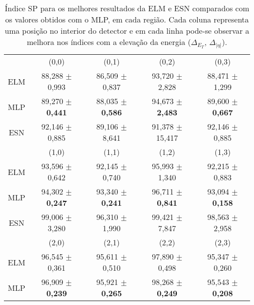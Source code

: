 \begin{table}[H]
	\centering
	\caption{Índice SP para os melhores resultados da ELM e ESN comparados com os valores obtidos com o MLP, em cada região. Cada coluna representa uma posição no interior do detector e em cada linha pode-se observar a melhora nos índices com a elevação da energia ($\Delta_{E_T}$, $\Delta_{|\eta|}$).}
	\label{tab:sp_2015}
	\begin{footnotesize}
		\setlength{\extrarowheight}{0pt}       %
		\begin{tabular}{c*{4}c} \toprule
		    	&        (0,0)       &       (0,1)        &       (0,2)         &  (0,3)         \\ \cmidrule(lr){2-2}\cmidrule(lr){3-3}\cmidrule(lr){4-4}\cmidrule(lr){5-5}
			ELM & 88,288 $\pm$ 0,993 & 86,509 $\pm$ 0,837 & 93,720 $\pm$  2,828 & 88,471 $\pm$ 1,299 \\
			MLP & 89,270 $\pm$ \textbf{0,441} & 88,035 $\pm$ \textbf{0,586} & 94,673 $\pm$  \textbf{2,483} & 89,600 $\pm$ \textbf{0,667} \\
			ESN & \cellcolor{blue!15}92,146 $\pm$ 0,885 & 89,106 $\pm$ 8,641 & 91,378 $\pm$ 15,417 & \cellcolor{blue!15}92,146 $\pm$ 0,885 \\ \midrule \midrule
                &        (1,0)       &       (1,1)        &        (1,2)        & (1,3)        \\ \cmidrule(lr){2-2}\cmidrule(lr){3-3}\cmidrule(lr){4-4}\cmidrule(lr){5-5}			
			ELM & 93,596 $\pm$ 0,642 & 92,145 $\pm$ 0,740 & 95,993 $\pm$  1,340 & 92,215 $\pm$ 0,883 \\
			MLP & 94,302 $\pm$ \textbf{0,247} & 93,340 $\pm$ \textbf{0,241} & 96,711 $\pm$  \textbf{0,841} & 93,094 $\pm$ \textbf{0,158} \\
			ESN & 99,006 $\pm$ 3,280 & 96,310 $\pm$ 1,990 & 99,421 $\pm$  7,847 & 98,563 $\pm$ 2,958 \\ \midrule \midrule
		      &          (2,0)       &        (2,1)       &        (2,2)        &       (2,3)        \\ \cmidrule(lr){2-2}\cmidrule(lr){3-3}\cmidrule(lr){4-4}\cmidrule(lr){5-5}			
			ELM & 96,545 $\pm$ 0,361 & 95,611 $\pm$ 0,510 & 97,890 $\pm$  0,498 & 95,347 $\pm$ 0,260 \\
			MLP & 96,909 $\pm$ \textbf{0,239} & 95,921 $\pm$ \textbf{0,265} & 98,268 $\pm$  \textbf{0,249} & 95,543 $\pm$ \textbf{0,208} \\

\end{tabular}
\end{footnotesize}
\end{table}
